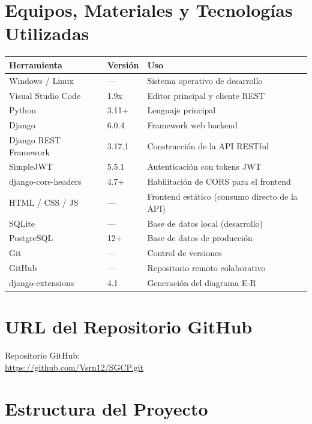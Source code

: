 \documentclass[12pt,a4paper]{article}
\begin{document}
\section{Equipos, Materiales y Tecnologías Utilizadas}

\begin{tabular}{lll}
    \toprule
    \textbf{Herramienta} & \textbf{Versión} & \textbf{Uso} \\
    \midrule
    Windows / Linux & --- & Sistema operativo de desarrollo \\
    Visual Studio Code & 1.9x & Editor principal y cliente REST \\
    Python & 3.11+ & Lenguaje principal \\
    Django & 6.0.4 & Framework web backend \\
    Django REST Framework & 3.17.1 & Construcción de la API RESTful \\
    SimpleJWT & 5.5.1 & Autenticación con tokens JWT \\
    django-cors-headers & 4.7+ & Habilitación de CORS para el frontend \\
    HTML / CSS / JS & --- & Frontend estático (consumo directo de la API) \\
    SQLite & --- & Base de datos local (desarrollo) \\
    PostgreSQL & 12+ & Base de datos de producción \\
    Git & --- & Control de versiones \\
    GitHub & --- & Repositorio remoto colaborativo \\
    django-extensions & 4.1 & Generación del diagrama E-R \\
    \bottomrule
\end{tabular}

\section{URL del Repositorio GitHub}

Repositorio GitHub:\\
\url{https://github.com/Vsrn12/SGCP.git}

\section{Estructura del Proyecto}
\end{document}
